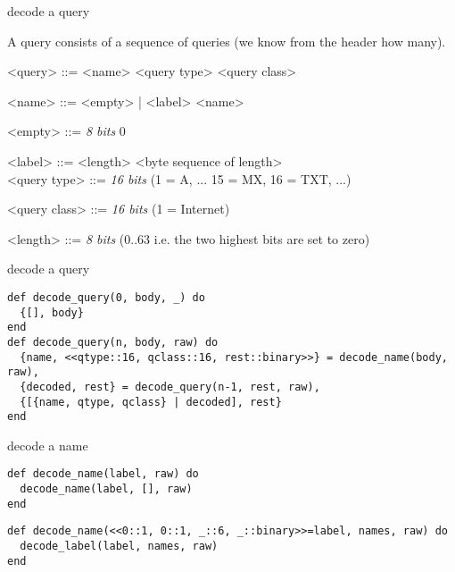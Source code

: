 \begin{frame}{decode a query}

A query consists of a sequence of queries (we know from the header how many).

\begin{grammar}
<query> ::= <name> <query type> <query class>

<name> ::= <empty> | <label> <name>

<empty> ::=  {\em 8 bits} 0 

<label> ::=  <length> <byte sequence of length> \\

<query type> ::= {\em 16 bits}  (1 = A, ... 15 = MX, 16 = TXT, ...)

<query class> ::= {\em 16 bits} (1 = Internet)

<length> ::= {\em 8 bits}  (0..63 i.e. the two highest bits are set to zero)

\end{grammar}


\end{frame}

\begin{frame}[fragile]{decode a query}

\begin{verbatim}
def decode_query(0, body, _) do
  {[], body}
end
def decode_query(n, body, raw) do
  {name, <<qtype::16, qclass::16, rest::binary>>} = decode_name(body, raw),
  {decoded, rest} = decode_query(n-1, rest, raw),
  {[{name, qtype, qclass} | decoded], rest}
end
\end{verbatim}

\end{frame}


\begin{frame}[fragile]{decode a name}

\begin{verbatim}
def decode_name(label, raw) do
  decode_name(label, [], raw)
end
\end{verbatim}
\vspace{20pt}\pause

\begin{verbatim}
def decode_name(<<0::1, 0::1, _::6, _::binary>>=label, names, raw) do
  decode_label(label, names, raw)
end
\end{verbatim}
\end{frame}


